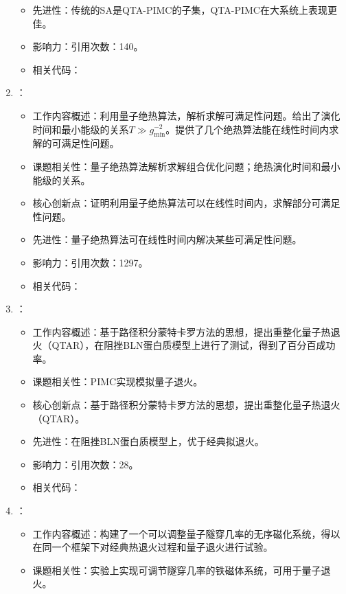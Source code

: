 \begin{enumerate}
\begin{itemize}
                \item 先进性：传统的SA是QTA-PIMC的子集，QTA-PIMC在大系统上表现更佳。
                \item 影响力：引用次数：140。
                \item 相关代码：
            \end{itemize}
        \item \citet{farhi2000quantum}：
        \begin{itemize}
            \item 工作内容概述：利用量子绝热算法，解析求解可满足性问题。给出了演化时间和最小能级的关系$T\gg g_{\text{min}}^{-2}$。提供了几个绝热算法能在线性时间内求解的可满足性问题。
            \item 课题相关性：量子绝热算法解析求解组合优化问题；绝热演化时间和最小能级的关系。
            \item 核心创新点：证明利用量子绝热算法可以在线性时间内，求解部分可满足性问题。
            \item 先进性：量子绝热算法可在线性时间内解决某些可满足性问题。
            \item 影响力：引用次数：1297。
            \item 相关代码：
        \end{itemize}
        \item \citet{lee2001quantum}：
            \begin{itemize}
                \item 工作内容概述：基于路径积分蒙特卡罗方法的思想，提出重整化量子热退火（QTAR），在阻挫BLN蛋白质模型上进行了测试，得到了百分百成功率。
                \item 课题相关性：PIMC实现模拟量子退火。
                \item 核心创新点：基于路径积分蒙特卡罗方法的思想，提出重整化量子热退火（QTAR）。
                \item 先进性：在阻挫BLN蛋白质模型上，优于经典拟退火。
                \item 影响力：引用次数：28。
                \item 相关代码：
            \end{itemize}
            \item \citet{brooke2001tunable}：
            \begin{itemize}
                \item 工作内容概述：构建了一个可以调整量子隧穿几率的无序磁化系统，得以在同一个框架下对经典热退火过程和量子退火进行试验。
                \item 课题相关性：实验上实现可调节隧穿几率的铁磁体系统，可用于量子退火。

\end{itemize}
\end{enumerate}
